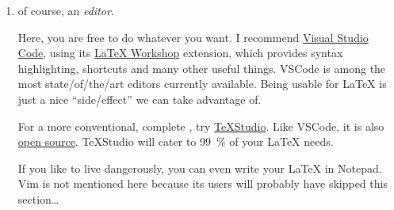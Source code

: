 \begin{enumerate}
       Another viable alternative is \href{https://miktex.org/}{MiKTeX}.
       It has a rolling release model, aka updates to packages are published
       whenever they are deemed ready.
       MiKTeX's  (the \emph{MiKTeX Console}) is pretty
       polished and usable, see \cref{fig:miktex_gui}.

       \begin{figure}
       \end{figure}

       You should hit that juicy \emph{Check for updates} at least yearly, rather
       biannually.
       \LaTeX{} is a slow world, in which files from the previous millennium might
       very well still compile and look fine.
       However, a very large share of errors are caused by out\-/of\-/date packages.
       For example, if your \LaTeX{} distribution is ancient (anything older than,
       say, three years), and you then compile a new file that installs a new
       package, you suddenly have that package in its latest version, alongside
       all the old packages.
       That will not go well long.
    \item of course, an \emph{editor}.

       Here, you are free to do whatever you want.
       I recommend \href{https://code.visualstudio.com/}{Visual Studio Code}, using its
       \href{https://marketplace.visualstudio.com/items?itemName=James-Yu.latex-workshop}%
       {\LaTeX{} Workshop} extension, which provides syntax highlighting, shortcuts
       and many other useful things.
       VSCode is among the most state\-/of\-/the\-/art editors currently available.
       Being usable for \LaTeX{} is just a nice \enquote{side\-/effect} we can take
       advantage of.

       For a more conventional, complete ,
       try \href{https://www.texstudio.org/}{TeXStudio}.
       Like VSCode, it is also
       \href{https://github.com/texstudio-org/texstudio}{open source}.
       TeXStudio will cater to \SI{99}{\percent} of your \LaTeX{} needs.

       If you like to live dangerously, you can even write your \LaTeX{} in Notepad.
        Vim is not mentioned here because its users will probably have skipped this
        section\dots{}
\end{enumerate}

